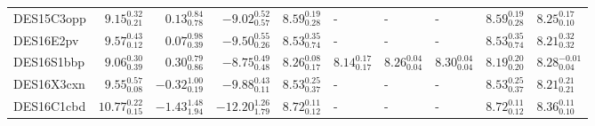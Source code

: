 \documentclass[fleqn,usenatbib,]{mnras}
\begin{document}
\begin{table}
\begin{threeparttable}
\begin{tabular}{lrrrllllll}
DES15C3opp &   $9.15 _{\scriptscriptstyle 0.21} ^{\scriptscriptstyle 0.32}$ &   $0.13 _{\scriptscriptstyle 0.78} ^{\scriptscriptstyle 0.84}$ &   $-9.02 _{\scriptscriptstyle 0.57} ^{\scriptscriptstyle 0.52}$ &  $8.59 _{\scriptscriptstyle 0.28} ^{\scriptscriptstyle 0.19}$ &                                                             - &                                                             - &                                                             - &  $8.59 _{\scriptscriptstyle 0.28} ^{\scriptscriptstyle 0.19}$ &   $8.25 _{\scriptscriptstyle 0.10} ^{\scriptscriptstyle 0.17}$ \\
DES16E2pv  &   $9.57 _{\scriptscriptstyle 0.12} ^{\scriptscriptstyle 0.43}$ &   $0.07 _{\scriptscriptstyle 0.39} ^{\scriptscriptstyle 0.98}$ &   $-9.50 _{\scriptscriptstyle 0.26} ^{\scriptscriptstyle 0.55}$ &  $8.53 _{\scriptscriptstyle 0.74} ^{\scriptscriptstyle 0.35}$ &                                                             - &                                                             - &                                                             - &  $8.53 _{\scriptscriptstyle 0.74} ^{\scriptscriptstyle 0.35}$ &   $8.21 _{\scriptscriptstyle 0.32} ^{\scriptscriptstyle 0.32}$ \\
DES16S1bbp &   $9.06 _{\scriptscriptstyle 0.39} ^{\scriptscriptstyle 0.30}$ &   $0.30 _{\scriptscriptstyle 0.86} ^{\scriptscriptstyle 0.79}$ &   $-8.75 _{\scriptscriptstyle 0.48} ^{\scriptscriptstyle 0.49}$ &  $8.26 _{\scriptscriptstyle 0.17} ^{\scriptscriptstyle 0.08}$ &  $8.14 _{\scriptscriptstyle 0.17} ^{\scriptscriptstyle 0.17}$ &  $8.26 _{\scriptscriptstyle 0.04} ^{\scriptscriptstyle 0.04}$ &  $8.30 _{\scriptscriptstyle 0.04} ^{\scriptscriptstyle 0.04}$ &  $8.19 _{\scriptscriptstyle 0.20} ^{\scriptscriptstyle 0.20}$ &  $8.28 _{\scriptscriptstyle 0.04} ^{\scriptscriptstyle -0.01}$ \\
DES16X3cxn &   $9.55 _{\scriptscriptstyle 0.08} ^{\scriptscriptstyle 0.57}$ &  $-0.32 _{\scriptscriptstyle 0.19} ^{\scriptscriptstyle 1.00}$ &   $-9.88 _{\scriptscriptstyle 0.11} ^{\scriptscriptstyle 0.43}$ &  $8.53 _{\scriptscriptstyle 0.37} ^{\scriptscriptstyle 0.25}$ &                                                             - &                                                             - &                                                             - &  $8.53 _{\scriptscriptstyle 0.37} ^{\scriptscriptstyle 0.25}$ &   $8.21 _{\scriptscriptstyle 0.21} ^{\scriptscriptstyle 0.21}$ \\
DES16C1cbd &  $10.77 _{\scriptscriptstyle 0.15} ^{\scriptscriptstyle 0.22}$ &  $-1.43 _{\scriptscriptstyle 1.94} ^{\scriptscriptstyle 1.48}$ &  $-12.20 _{\scriptscriptstyle 1.79} ^{\scriptscriptstyle 1.26}$ &  $8.72 _{\scriptscriptstyle 0.12} ^{\scriptscriptstyle 0.11}$ &                                                             - &                                                             - &                                                             - &  $8.72 _{\scriptscriptstyle 0.12} ^{\scriptscriptstyle 0.11}$ &   $8.36 _{\scriptscriptstyle 0.10} ^{\scriptscriptstyle 0.11}$ \\

\end{tabular}
\end{threeparttable}
\end{table}
\end{document}
